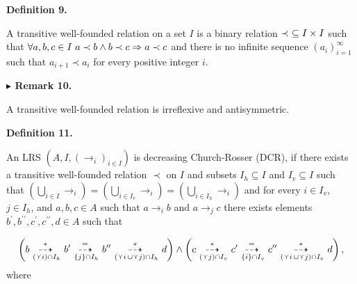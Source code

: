 \documentclass[10pt,a4paper]{amsart}
\begin{document}
 
 
 
\par\medskip\noindent\textbf{Definition 9.}\par
 
 
A transitive well-founded relation on a set $I$ is a binary relation $\prec\leavevmode\nobreak\ \subseteq I\times I$ such that $\forall a,b,c\in I\leavevmode\nobreak\ a\prec b\wedge b\prec c\Rightarrow a\prec
c$ and there is no infinite sequence $(a_{i})_{i=1}^{\infty}$ such that $a_{i+1}\prec a_{i}$ for every positive integer $i$.\par
 
 
 
 
\par\medskip\noindent\textbf{$\blacktriangleright$ Remark 10.}\par
 
 
A transitive well-founded relation is irreflexive and antisymmetric.\par
 
 
 
 
\par\medskip\noindent\textbf{Definition 11.}\par
 
 
An LRS $(A,I,(\to_{i})_{i\in I})$ is decreasing Church-Rosser (DCR), if there exists a transitive well-founded relation $\prec$ on $I$ and subsets $I_{h}\subseteq I$ and $I_{v}\subseteq I$ such that $\left(\bigcup_{i\in I}\to_{i}\right)=\left(\bigcup_{i\in I_{v}}\to_{i}\right)=%
\left(\bigcup_{i\in I_{h}}\to_{i}\right)$ and for every $i\in I_{v}$, $j\in I_{h}$, and $a,b,c\in A$ such that $a\to_{i}b$ and $a\to_{j}c$ there exists elements $b^{\prime},b^{\prime\prime},c^{\prime},c^{\prime\prime},d\in A$ such that\par
    \[\left(b\leavevmode\nobreak\ {\mathop{\buildrel*\over{\dashrightarrow}\;}%
\limits_{(\curlyvee i)\cap I_{h}}}\leavevmode\nobreak\ b^{\prime}\leavevmode%
\nobreak\ {\mathop{\buildrel=\over{\dashrightarrow}\;}\limits_{\{j\}\cap I_{h}%
}}\leavevmode\nobreak\ b^{\prime\prime}\leavevmode\nobreak\ {\mathop{\buildrel%
*\over{\dashrightarrow}\;}\limits_{(\curlyvee i\,\cup\curlyvee j)\cap I_{h}}}%
\leavevmode\nobreak\ d\right)\wedge\left(c\leavevmode\nobreak\ {\mathop{%
\buildrel*\over{\dashrightarrow}\;}\limits_{(\curlyvee j)\cap I_{v}}}%
\leavevmode\nobreak\ c^{\prime}\leavevmode\nobreak\ {\mathop{\buildrel=\over{%
\dashrightarrow}\;}\limits_{\{i\}\cap I_{v}}}\leavevmode\nobreak\ c^{\prime%
\prime}\leavevmode\nobreak\ {\mathop{\buildrel*\over{\dashrightarrow}\;}%
\limits_{(\curlyvee i\,\cup\curlyvee j)\cap I_{v}}}\leavevmode\nobreak\ d%
\right),\]    
where\par
  
\end{document}
